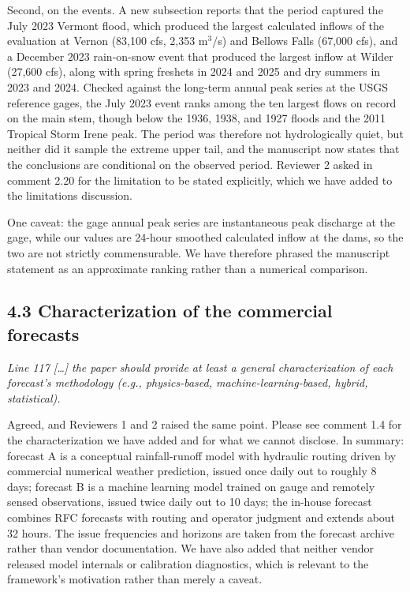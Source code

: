 \documentclass[11pt]{article}
\newenvironment{rc}%
  {\begin{list}{}{\setlength{\leftmargin}{1.5em}\setlength{\rightmargin}{1.5em}%
   \setlength{\topsep}{0.2em}\setlength{\parsep}{0pt}\setlength{\itemsep}{0pt}}%
   \item[]\itshape\color{quotegray}}%
  {\end{list}}
\begin{document}
Second, on the events. A new subsection reports that the period captured the July 2023 Vermont
flood, which produced the largest calculated inflows of the evaluation at Vernon (83,100 cfs,
2,353 m$^3$/s) and Bellows Falls (67,000 cfs), and a December 2023 rain-on-snow event that produced
the largest inflow at Wilder (27,600 cfs), along with spring freshets in 2024 and 2025 and dry
summers in 2023 and 2024. Checked against the long-term annual peak series at the USGS reference
gages, the July 2023 event ranks among the ten largest flows on record on the main stem, though below
the 1936, 1938, and 1927 floods and the 2011 Tropical Storm Irene peak. The period was therefore not
hydrologically quiet, but neither did it sample the extreme upper tail, and the manuscript now states that
the conclusions are conditional on the observed period. Reviewer 2 asked in comment 2.20 for the
limitation to be stated explicitly, which we have added to the limitations discussion.

One caveat: the gage annual peak series are instantaneous peak discharge at the gage, while our
values are 24-hour smoothed calculated inflow at the dams, so the two are not strictly commensurable.
We have therefore phrased the manuscript statement as an approximate ranking rather than a numerical
comparison.

\subsection*{4.3 Characterization of the commercial forecasts}

\begin{rc}
Line 117 [\ldots] the paper should provide at least a general characterization of each forecast's
methodology (e.g., physics-based, machine-learning-based, hybrid, statistical).
\end{rc}

Agreed, and Reviewers 1 and 2 raised the same point. Please see comment 1.4 for the characterization
we have added and for what we cannot disclose. In summary: forecast A is a conceptual
rainfall-runoff model with hydraulic routing driven by commercial numerical weather prediction,
issued once daily out to roughly 8 days; forecast B is a machine learning model trained on gauge and
remotely sensed observations, issued twice daily out to 10 days; the in-house forecast combines RFC
forecasts with routing and operator judgment and extends about 32 hours. The issue frequencies and
horizons are taken from the forecast archive rather than vendor documentation. We have also added
that neither vendor released model internals or calibration diagnostics, which is relevant to the
framework's motivation rather than merely a caveat.
\end{document}
